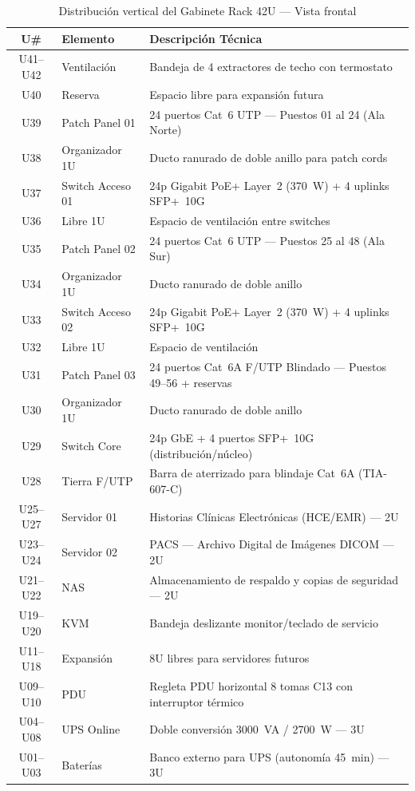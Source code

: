 \begin{table}[H]
\centering
\caption{Distribución vertical del Gabinete Rack 42U --- Vista frontal}
\small
\begin{tabularx}{\textwidth}{@{} c >{\raggedright\arraybackslash}p{3.8cm} X @{}}
\toprule
\textbf{U\#} & \textbf{Elemento} & \textbf{Descripción Técnica} \\
\midrule
U41--U42 & Ventilación    & Bandeja de 4 extractores de techo con termostato \\
U40      & Reserva        & Espacio libre para expansión futura \\
U39      & Patch Panel 01 & 24 puertos Cat~6 UTP --- Puestos 01 al 24 (Ala Norte) \\
U38      & Organizador 1U & Ducto ranurado de doble anillo para patch cords \\
U37      & Switch Acceso 01 & 24p Gigabit PoE+ Layer~2 (370~W) + 4 uplinks SFP+~10G \\
U36      & Libre 1U       & Espacio de ventilación entre switches \\
U35      & Patch Panel 02 & 24 puertos Cat~6 UTP --- Puestos 25 al 48 (Ala Sur) \\
U34      & Organizador 1U & Ducto ranurado de doble anillo \\
U33      & Switch Acceso 02 & 24p Gigabit PoE+ Layer~2 (370~W) + 4 uplinks SFP+~10G \\
U32      & Libre 1U       & Espacio de ventilación \\
U31      & Patch Panel 03 & 24 puertos Cat~6A F/UTP Blindado --- Puestos 49--56 + reservas \\
U30      & Organizador 1U & Ducto ranurado de doble anillo \\
U29      & Switch Core    & 24p GbE + 4 puertos SFP+~10G (distribución/núcleo) \\
U28      & Tierra F/UTP   & Barra de aterrizado para blindaje Cat~6A (TIA-607-C) \\
U25--U27 & Servidor 01    & Historias Clínicas Electrónicas (HCE/EMR) --- 2U \\
U23--U24 & Servidor 02    & PACS --- Archivo Digital de Imágenes DICOM --- 2U \\
U21--U22 & NAS            & Almacenamiento de respaldo y copias de seguridad --- 2U \\
U19--U20 & KVM            & Bandeja deslizante monitor/teclado de servicio \\
U11--U18 & Expansión      & 8U libres para servidores futuros \\
U09--U10 & PDU            & Regleta PDU horizontal 8 tomas C13 con interruptor térmico \\
U04--U08 & UPS Online     & Doble conversión 3000~VA / 2700~W --- 3U \\
U01--U03 & Baterías       & Banco externo para UPS (autonomía 45~min) --- 3U \\
\bottomrule
\end{tabularx}
\label{tab:rack}
\end{table}

